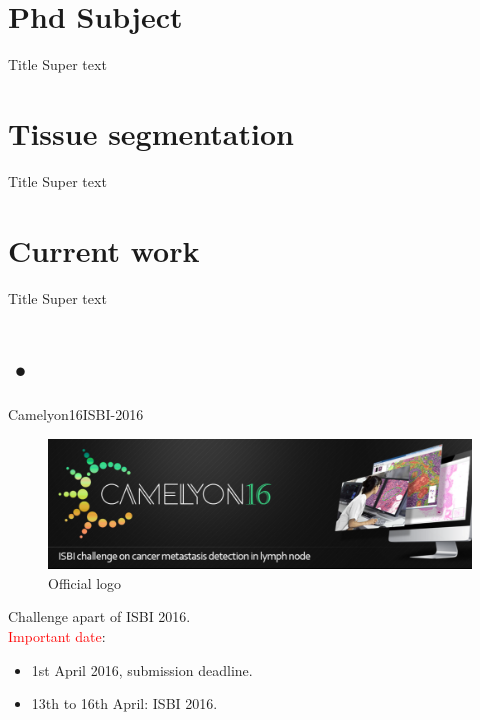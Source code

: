 \documentclass{beamer}
\begin{document}
\section{Phd Subject}

\begin{frame}{Title}
Super text
\end{frame}


\section{Tissue segmentation}
\begin{frame}{Title}
Super text
\end{frame}

\section{Current work}
\begin{frame}{Title}
Super text
\end{frame}

\section{•}


\begin{frame}{Camelyon16}{ISBI-2016}

\begin{figure}[!ht]
\centering
\includegraphics[width=\textwidth]{Camelyon16.png}
\caption{Official logo}
\label{Ol}
\end{figure}
Challenge apart of ISBI 2016. \\
\textcolor{red}{Important date}:
\begin{itemize}
\item 1st April 2016, submission deadline.
\item 13th to 16th April: ISBI 2016.
\end{itemize}
\end{frame}
\end{document}
